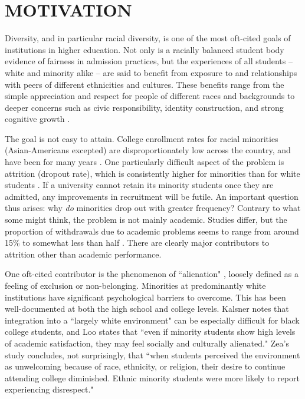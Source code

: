 \section{MOTIVATION}
\label{sec:intro}

Diversity, and in particular racial diversity, is one of the most oft-cited
goals of institutions in higher education. Not only is a racially balanced
student body evidence of fairness in admission practices, but the experiences
of all students -- white and minority alike -- are said to benefit from
exposure to and relationships with peers of different ethnicities and
cultures. These benefits range from the simple appreciation and respect for
people of different races and backgrounds to deeper concerns such as civic
responsibility, identity construction, and strong cognitive
growth \cite{gurin_diversity_2002}.

The goal is not easy to attain. College enrollment rates for racial minorities
(Asian-Americans excepted) are disproportionately low across the country, and
have been for many years \cite{ryu_minorities_2010}. One particularly difficult
aspect of the problem is attrition (dropout rate), which is consistently
higher for minorities than for white students \cite{zea_predicting_1997}. If a
university cannot retain its minority students once they are admitted, any
improvements in recruitment will be futile. An important question thus
arises: why \textit{do} minorities drop out with greater frequency? Contrary
to what some might think, the problem is not mainly academic. Studies differ,
but the proportion of withdrawals due to academic problems seems to range from
around 15\% \cite{kalsner_issues_1991} to somewhat less than
half \cite{suen_alienation_1983}. There are clearly major contributors to
attrition other than academic performance.

One oft-cited contributor is the phenomenon of
``alienation" \cite{burbach_development_1972,dean_alienation:_1961}, loosely
defined as a feeling of exclusion or non-belonging. Minorities at
predominantly white institutions have significant psychological barriers to
overcome. This has been well-documented at both the high
school \cite{calabrese_structure_1988} and college \cite{nora_role_1996} levels.
Kalsner notes that integration into a ``largely white environment" can be
especially difficult for black college students, and Loo states that ``even if
minority students show high levels of academic satisfaction, they may feel
socially and culturally alienated." \cite{loo_alienation_1986} Zea's study
concludes, not surprisingly, that ``when students perceived the environment as
unwelcoming because of race, ethnicity, or religion, their desire to continue
attending college diminished. Ethnic minority students were more likely to
report experiencing disrespect." \cite{zea_predicting_1997}

